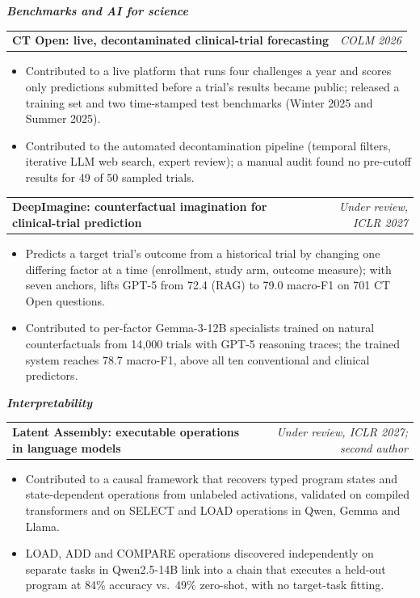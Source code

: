 \documentclass[10pt,letterpaper]{article}
\makeatletter
\newcommand{\project}[2]{%
  \vspace{2pt}%
  \begin{tabularx}{\linewidth}{@{}X r@{}}
    \textbf{#1} & \textit{#2} \\
  \end{tabularx}\par}
\newcommand{\theme}[1]{\vspace{2pt}\textit{\textbf{#1}}\par}
\makeatother
\begin{document}
\theme{Benchmarks and AI for science}
\project{CT Open: live, decontaminated clinical-trial forecasting}{COLM 2026}
\begin{itemize}
  \item Contributed to a live platform that runs four challenges a year and scores only predictions submitted before a trial's results became public; released a training set and two time-stamped test benchmarks (Winter 2025 and Summer 2025).
  \item Contributed to the automated decontamination pipeline (temporal filters, iterative LLM web search, expert review); a manual audit found no pre-cutoff results for 49 of 50 sampled trials.
\end{itemize}
\project{DeepImagine: counterfactual imagination for clinical-trial prediction}{Under review, ICLR 2027}
\begin{itemize}
  \item Predicts a target trial's outcome from a historical trial by changing one differing factor at a time (enrollment, study arm, outcome measure); with seven anchors, lifts GPT-5 from 72.4 (RAG) to 79.0 macro-F1 on 701 CT Open questions.
  \item Contributed to per-factor Gemma-3-12B specialists trained on natural counterfactuals from 14,000 trials with GPT-5 reasoning traces; the trained system reaches 78.7 macro-F1, above all ten conventional and clinical predictors.
\end{itemize}

\theme{Interpretability}
\project{Latent Assembly: executable operations in language models}{Under review, ICLR 2027; second author}
\begin{itemize}
  \item Contributed to a causal framework that recovers typed program states and state-dependent operations from unlabeled activations, validated on compiled transformers and on SELECT and LOAD operations in Qwen, Gemma and Llama.
  \item LOAD, ADD and COMPARE operations discovered independently on separate tasks in Qwen2.5-14B link into a chain that executes a held-out program at 84\% accuracy vs.\ 49\% zero-shot, with no target-task fitting.
\end{itemize}
\end{document}
